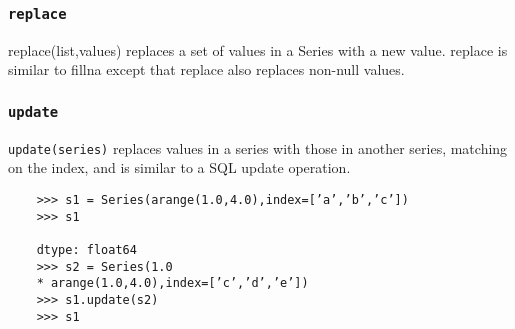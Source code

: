\documentclass[KSmain.tex]{subfiles}
\begin{document}
\subsubsection*{\texttt{replace}}
replace(list,values) replaces a set of values in a Series with a new value. replace is similar to fillna
except that replace also replaces non-null values.

\subsubsection*{\texttt{update}}
\texttt{update(series)} replaces values in a series with those in another series, matching on the index, and is similar
to a SQL update operation.
\begin{framed}
	\begin{verbatim}
	>>> s1 = Series(arange(1.0,4.0),index=[’a’,’b’,’c’])
	>>> s1
	
	dtype: float64
	>>> s2 = Series(1.0
	* arange(1.0,4.0),index=[’c’,’d’,’e’])
	>>> s1.update(s2)
	>>> s1
	\end{verbatim}
\end{framed}
\end{document}
